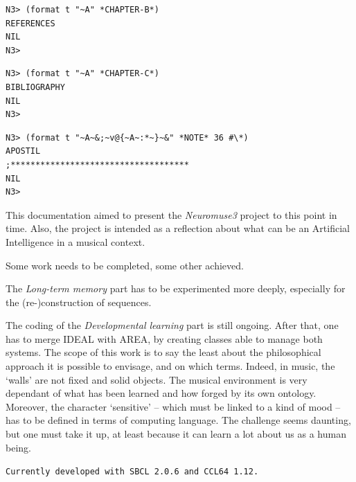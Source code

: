 \documentclass{article}
\begin{document}
\begin{lstlisting}[language=sectitle]
N3> (format t "~A" *CHAPTER-B*)
REFERENCES
NIL
N3> 
\end{lstlisting}

\bigskip
\bigskip

\begin{lstlisting}[language=sectitle]
N3> (format t "~A" *CHAPTER-C*)
BIBLIOGRAPHY
NIL
N3> 
\end{lstlisting}


\bigskip
\bigskip

\begin{lstlisting}[language=sectitle]
N3> (format t "~A~&;~v@{~A~:*~}~&" *NOTE* 36 #\*)
APOSTIL
;************************************
NIL
N3> 
\end{lstlisting}

\bigskip

This documentation aimed to present the \textsl{Neuromuse3} project to this point in time. Also, the project is intended as a reflection about what can be an Artificial Intelligence in a musical context. 

Some work needs to be completed, some other achieved.

\bigskip

The \textsl{Long-term memory} part has to be experimented more deeply, especially for the (re-)construction of sequences. 

\bigskip

The coding of the \textsl{Developmental learning} part is still ongoing. 
After that, one has to merge IDEAL with AREA, by creating classes able to manage both systems. The scope of this work is to say the least about the philosophical approach it is possible to envisage, and on which terms. Indeed, in music, the `walls' are not  fixed and solid objects. The musical environment is very dependant of what has been learned and how forged by its own ontology. Moreover, the character `sensitive' -- which must be linked to a kind of mood -- has to be defined in terms of computing language. The challenge seems daunting, but one must take it up, at least because it can learn a lot about us as a human being.

\bigskip

\texttt{\small Currently developed with SBCL 2.0.6 and CCL64 1.12.}
\end{document}
